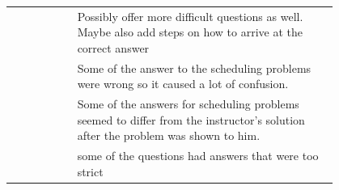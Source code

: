 \begin{longtable}{r|p{0.8\linewidth}}
		& Possibly offer more difficult questions as well. Maybe also add steps on how to arrive at the correct answer                                                                                                                                                                                                                                                                                                                                                                                                                                                                                                                                                                                                                                     \\
		& Some of the answer to the scheduling problems were wrong so it caused a lot of confusion.                                                                                                                                                                                                                                                                                                                                                                                                                                                                                                                                                                                                                                                        \\
		& Some of the answers for scheduling problems seemed to differ from the instructor's solution after the problem was shown to him.                                                                                                                                                                                                                                                                                                                                                                                                                                                                                                                                                                                                                  \\
		& some of the questions had answers that were too strict                                                                                                                                                                                                                                                                                                                                                                                                                                                                                                                                                                                                                                                                                           \\

\end{longtable}
